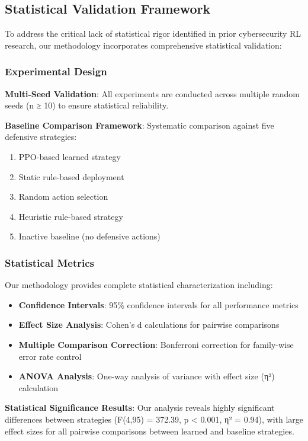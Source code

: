 \subsection{Statistical Validation Framework}

To address the critical lack of statistical rigor identified in prior cybersecurity RL research, our methodology incorporates comprehensive statistical validation:

\subsubsection{Experimental Design}

\textbf{Multi-Seed Validation}: All experiments are conducted across multiple random seeds (n ≥ 10) to ensure statistical reliability.

\textbf{Baseline Comparison Framework}: Systematic comparison against five defensive strategies:
\begin{enumerate}
    \item PPO-based learned strategy
    \item Static rule-based deployment  
    \item Random action selection
    \item Heuristic rule-based strategy
    \item Inactive baseline (no defensive actions)
\end{enumerate}

\subsubsection{Statistical Metrics}

Our methodology provides complete statistical characterization including:

\begin{itemize}
    \item \textbf{Confidence Intervals}: 95\% confidence intervals for all performance metrics
    \item \textbf{Effect Size Analysis}: Cohen's d calculations for pairwise comparisons
    \item \textbf{Multiple Comparison Correction}: Bonferroni correction for family-wise error rate control
    \item \textbf{ANOVA Analysis}: One-way analysis of variance with effect size (η²) calculation
\end{itemize}

\textbf{Statistical Significance Results}: Our analysis reveals highly significant differences between strategies (F(4,95) = 372.39, p < 0.001, η² = 0.94), with large effect sizes for all pairwise comparisons between learned and baseline strategies.

